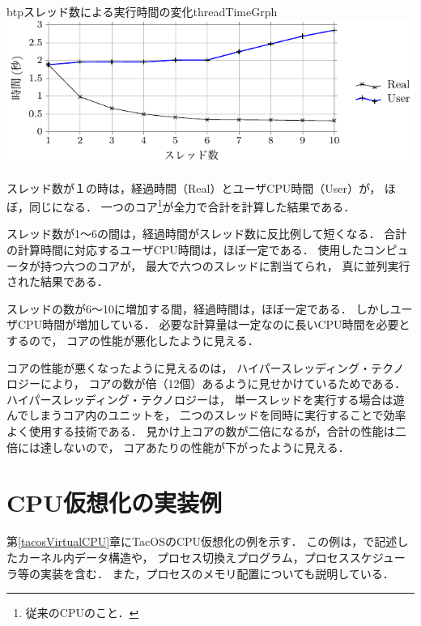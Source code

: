 \begin{myfig}{btp}{スレッド数による実行時間の変化}{threadTimeGrph}
  \includegraphics[scale=1.0]{Tbl/threadTimeGrph.pdf}
\end{myfig}

スレッド数が１の時は，経過時間（Real）とユーザCPU時間（User）が，
ほぼ，同じになる．
一つのコア\footnote{従来のCPUのこと．}が全力で合計を計算した結果である．

スレッド数が1〜6の間は，経過時間がスレッド数に反比例して短くなる．
合計の計算時間に対応するユーザCPU時間は，ほぼ一定である．
使用したコンピュータが持つ六つのコアが，
最大で六つのスレッドに割当てられ，
真に並列実行された結果である．

スレッドの数が6〜10に増加する間，経過時間は，ほぼ一定である．
しかしユーザCPU時間が増加している．
必要な計算量は一定なのに長いCPU時間を必要とするので，
コアの性能が悪化したように見える．

コアの性能が悪くなったように見えるのは，
ハイパースレッディング・テクノロジー\cite{hyperThreading}により，
コアの数が倍（12個）あるように見せかけているためである．
ハイパースレッディング・テクノロジーは，
単一スレッドを実行する場合は遊んでしまうコア内のユニットを，
二つのスレッドを同時に実行することで効率よく使用する技術である．
見かけ上コアの数が二倍になるが，合計の性能は二倍には達しないので，
コアあたりの性能が下がったように見える．


\section{CPU仮想化の実装例}
第\ref{tacosVirtualCPU}章にTacOSのCPU仮想化の例を示す．
この例は，{\cmml}で記述したカーネル内データ構造や，
プロセス切換えプログラム，プロセススケジューラ等の実装を含む．
また，プロセスのメモリ配置についても説明している．


